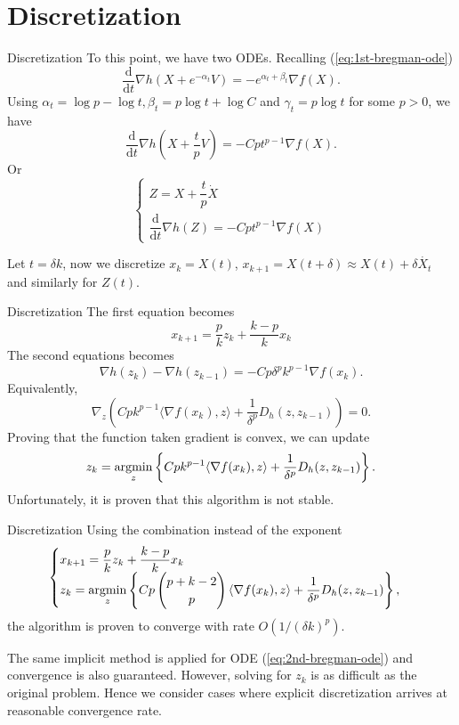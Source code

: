 \section{Discretization}

\begin{frame}{Discretization}
  To this point, we have two ODEs. Recalling (\ref{eq:1st-bregman-ode})
  $$\dfrac{\mathrm{d}}{\mathrm{d}t}\nabla h(X + e^{-\alpha_t}V) = -e^{\alpha_t+\beta_t}\nabla f(X).$$
  Using $\alpha_t = \log p - \log t, \beta_t = p\log t + \log C$ and $\gamma_t = p\log t$ for some $p > 0$, we have
  $$\dfrac{\mathrm{d}}{\mathrm{d}t}\nabla h(X + \dfrac{t}{p}V) = -Cpt^{p-1}\nabla f(X).$$
  Or
  \begin{equation}
    \begin{cases}
      Z = X + \dfrac{t}{p}\dot{X} \\
      \dfrac{\mathrm{d}}{\mathrm{d}t}\nabla h(Z) = -Cpt^{p-1}\nabla f(X)
    \end{cases}
  \end{equation}

  Let $t=\delta k$, now we discretize $x_k = X(t)$, $x_{k+1} = X(t+\delta)\approx X(t) + \delta \dot{X_t}$ and similarly for $Z(t)$.
\end{frame}

\begin{frame}{Discretization}
  The first equation becomes
  $$x_{k+1} = \dfrac{p}{k}z_k + \dfrac{k-p}{k}x_k$$
  The second equations becomes
  $$\nabla h(z_k) - \nabla h(z_{k-1}) = -Cp\delta^p k^{p-1} \nabla f(x_k).$$
  Equivalently,
  $$\nabla_z (Cp k^{p-1}\langle\nabla f(x_k), z\rangle + \dfrac{1}{\delta^p}D_h(z, z_{k-1})) = 0.$$
  Proving that the function taken gradient is convex, we can update
  $$z_{k} = \operatorname*{argmin}\limits_{z}\left\{Cp k^{p-1}\langle\nabla f(x_k), z\rangle + \dfrac{1}{\delta^p}D_h(z, z_{k-1})\right\}.$$
  Unfortunately, it is proven that this algorithm is not stable.
\end{frame}

\begin{frame}{Discretization}
  Using the combination instead of the exponent
  \begin{equation}
    \begin{cases}
      x_{k+1} = \dfrac{p}{k}z_k + \dfrac{k-p}{k}x_k \\
      z_{k} = \operatorname*{argmin}\limits_{z}\left\{Cp \begin{pmatrix}p+k-2 \\ p\end{pmatrix}\langle\nabla f(x_k), z\rangle + \dfrac{1}{\delta^p}D_h(z, z_{k-1})\right\},
    \end{cases}
  \end{equation}
  the algorithm is proven to converge with rate $O(1/(\delta k)^p)$.

  The same implicit method is applied for ODE (\ref{eq:2nd-bregman-ode}) and convergence is also guaranteed.
  However, solving for $z_k$ is as difficult as the original problem. Hence we consider cases where explicit discretization arrives at reasonable convergence rate.
\end{frame}

